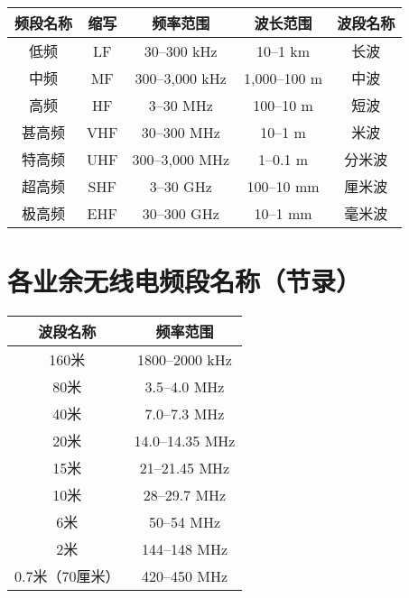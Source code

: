 \begin{tabular}{|c|c|c|c|c|}
  \hline
  \textbf{频段名称} & \textbf{缩写} & \textbf{频率范围}       & \textbf{波长范围} & \textbf{波段名称} \\
  \hline
  低频            & LF          & 30–300 \si{\kHz}    & 10–1 km       & 长波            \\
  \hline
  中频            & MF          & 300–3,000 \si{\kHz} & 1,000–100 m   & 中波            \\
  \hline
  高频            & HF          & 3–30 \si{\MHz}      & 100–10 m      & 短波            \\
  \hline
  甚高频           & VHF         & 30–300 \si{\MHz}    & 10–1 m        & 米波            \\
  \hline
  特高频           & UHF         & 300–3,000 \si{\MHz} & 1–0.1 m       & 分米波           \\
  \hline
  超高频           & SHF         & 3–30 \si{\GHz}      & 100–10 mm     & 厘米波           \\
  \hline
  极高频           & EHF         & 30–300 \si{\GHz}    & 10–1 mm       & 毫米波           \\
  \hline
\end{tabular}

\newpage

\section{各业余无线电频段名称（节录）}

\begin{longtable}{|c|c|}
  \hline
  \textbf{波段名称} & \textbf{频率范围}        \\
  \hline
  160米          & 1800–2000 \si{\kHz}  \\
  \hline
  80米           & 3.5–4.0 \si{\MHz}    \\
  \hline
  40米           & 7.0–7.3 \si{\MHz}    \\
  \hline
  20米           & 14.0–14.35 \si{\MHz} \\
  \hline
  15米           & 21–21.45 \si{\MHz}   \\
  \hline
  10米           & 28–29.7 \si{\MHz}    \\
  \hline
  6米            & 50–54 \si{\MHz}      \\
  \hline
  2米            & 144–148 \si{\MHz}    \\
  \hline
  0.7米（70厘米）    & 420–450 \si{\MHz}    \\
  \hline
\end{longtable}

